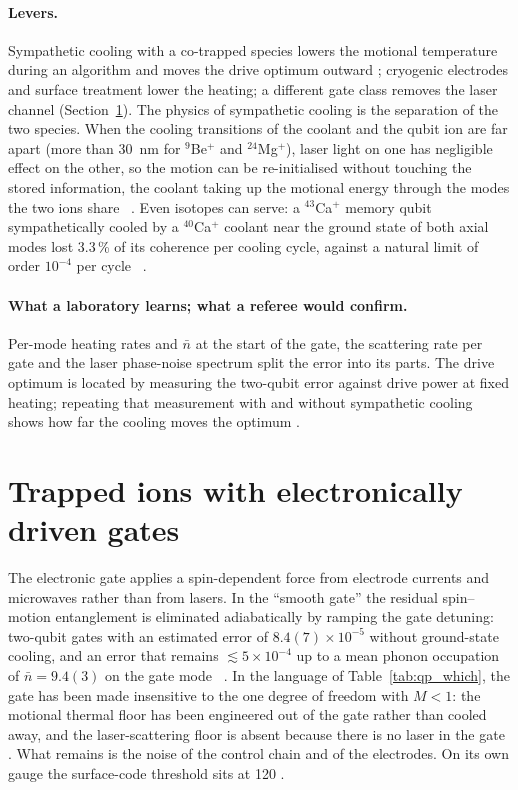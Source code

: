 \paragraph{Levers.} Sympathetic cooling with a co-trapped species lowers the motional temperature during an algorithm and moves the drive
optimum outward \interp; cryogenic electrodes and surface treatment lower the heating; a different gate class removes the laser channel
(Section~\ref{sec:qp_ionelec}). The physics of sympathetic cooling is the separation of the two species. When the cooling transitions of the coolant and the qubit
ion are far apart (more than 30~nm for $^{9}$Be$^+$ and $^{24}$Mg$^+$), laser light on one has negligible effect on the other, so the
motion can be re-initialised without touching the stored information, the coolant taking up the motional energy through
the modes the two ions share~\cite{Barrett2003} \observed. Even isotopes can serve: a $^{43}$Ca$^+$ memory qubit sympathetically cooled by a
$^{40}$Ca$^+$ coolant near the ground state of both axial modes lost 3.3\,\% of its coherence per cooling cycle, against a natural limit
of order $10^{-4}$ per cycle~\cite{Home2009} \observed.

\paragraph{What a laboratory learns; what a referee would confirm.} Per-mode heating rates and $\bar n$ at the start of the gate, the
scattering rate per gate and the laser phase-noise spectrum split the error into its parts. The drive optimum is located by measuring the
two-qubit error against drive power at fixed heating; repeating that measurement with and without sympathetic cooling shows how far the
cooling moves the optimum \interp.

\section{Trapped ions with electronically driven gates}\label{sec:qp_ionelec}
The electronic gate applies a spin-dependent force from electrode currents and microwaves rather than from lasers. In the ``smooth gate''
the residual spin--motion entanglement is eliminated adiabatically by ramping the gate detuning: two-qubit gates with an estimated error
of $8.4(7)\times10^{-5}$ without ground-state cooling, and an error that remains $\lesssim5\times10^{-4}$ up to a mean phonon occupation of
$\bar n=9.4(3)$ on the gate mode~\cite{Hughes2025} \observed. In the language of Table~\ref{tab:qp_which}, the gate has been made
insensitive to the one degree of freedom with $M<1$: the motional thermal floor has been engineered out of the gate rather than cooled away,
and the laser-scattering floor is absent because there is no laser in the gate \interp. What remains is the noise of the control chain and
of the electrodes. On its own gauge the surface-code threshold sits at 120 \calc.


